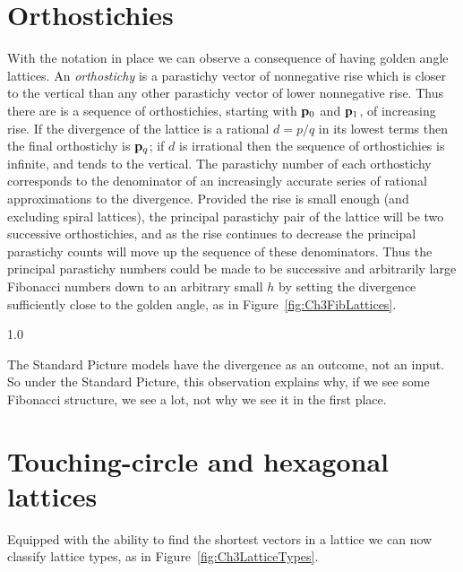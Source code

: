 \clearpage


\section{Orthostichies}
With the notation in place we can observe a consequence of having golden angle lattices. An \textit{orthostichy} is a parastichy vector of nonnegative rise which is closer to the vertical than any other parastichy vector of lower nonnegative rise.%
 Thus there are is a sequence of orthostichies,  starting with ${\mathbf p}_{0}$ and ${\mathbf p}_{1}$, of increasing rise. If the divergence of the lattice is a rational $d=p/q$ in its lowest terms then the final orthostichy is ${\mathbf p}_{q}$; if $d$ is irrational then the sequence of orthostichies is infinite, and tends to the vertical. The parastichy number of each orthostichy corresponds to the denominator of an increasingly accurate series of rational approximations to the divergence. Provided the rise is small enough (and excluding spiral lattices), the principal parastichy pair of the lattice will be two successive orthostichies,
and as the rise continues to decrease the principal parastichy counts will move up the sequence of these denominators. Thus the principal parastichy numbers could be made to be successive and arbitrarily large Fibonacci numbers down to an arbitrary small $h$ by setting the divergence sufficiently close to the golden angle, as in Figure~\ref{fig:Ch3FibLattices}.

{1.0}

The Standard Picture models have the divergence as an outcome, not an input. So under the Standard Picture, this observation explains why, if we see some Fibonacci structure, we see a lot, not why we see it in the first place. 
\clearpage


\section{Touching-circle and hexagonal lattices}
\label{sec:hexdef}
Equipped with the ability to find the shortest vectors in a lattice we can now classify lattice types, as in Figure~\ref{fig:Ch3LatticeTypes}.

